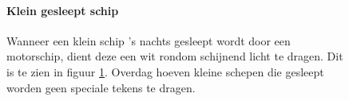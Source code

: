 \begin{figure}[H]
	\centering
	\begin{minipage}[t]{0.75\textwidth}
		\paragraph{Klein gesleept schip}
		Wanneer een klein schip 's nachts gesleept wordt door een motorschip, dient deze een wit rondom schijnend licht te dragen. Dit is te zien in figuur \ref{pic:optisch:klein_sleep}. Overdag hoeven kleine schepen die gesleept worden geen speciale tekens te dragen.
	\end{minipage}
	\hfill
	\begin{minipage}[t]{0.22\textwidth}
		\RemoveLine
		\caption{}
		\label{pic:optisch:klein_sleep}
	\end{minipage}
\end{figure}

